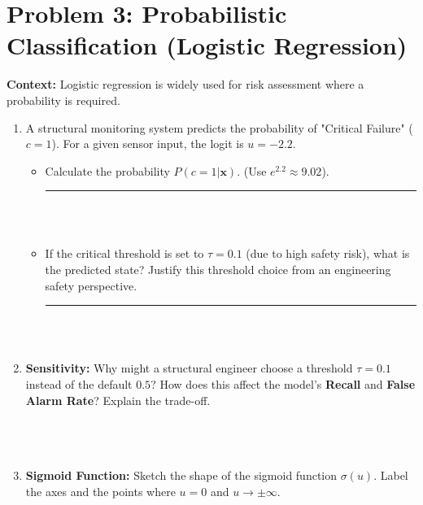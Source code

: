\documentclass[12pt]{article}
\begin{document}
\section{Problem 3: Probabilistic Classification (Logistic Regression)}
\textbf{Context:} Logistic regression is widely used for risk assessment where a probability is required.

\begin{enumerate}[label=(\alph*)]
    \item A structural monitoring system predicts the probability of "Critical Failure" ($c=1$). For a given sensor input, the logit is $u = -2.2$. 
    \begin{itemize}
        \item Calculate the probability $P(c=1|\bm{x})$. (Use $e^{2.2} \approx 9.02$). \rule{1.5in}{0.15mm} \\
        
        \fullunderline \\
        
        \item If the critical threshold is set to $\tau = 0.1$ (due to high safety risk), what is the predicted state? Justify this threshold choice from an engineering safety perspective. \rule{1in}{0.15mm} \\
        
        \fullunderline \\
        
    \end{itemize}

    \item \textbf{Sensitivity:} Why might a structural engineer choose a threshold $\tau = 0.1$ instead of the default $0.5$? How does this affect the model's \textbf{Recall} and \textbf{False Alarm Rate}? Explain the trade-off. \\
    
    \fullunderline \\
    
    \fullunderline \\
    
    \fullunderline \\


    \item \textbf{Sigmoid Function:} Sketch the shape of the sigmoid function $\sigma(u)$. Label the axes and the points where $u=0$ and $u \to \pm \infty$. 
    \begin{ex-box}
    \vspace{2.5in}
    \end{ex-box}
\end{enumerate}
\end{document}
